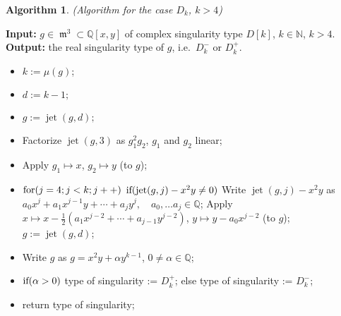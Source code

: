 \documentclass[noend]{amsproc}
\DeclareMathOperator{\m}{\mathfrak{m}}
\DeclareMathOperator{\jt}{jet}
\begin{document}
\newtheorem{D[k]k>4}[kjet]{Algorithm}
\begin{D[k]k>4}(Algorithm for the case $D_k$, $k>4$)
\end{D[k]k>4}
\noindent\textnormal{\bf Input:} $g\in \m^3\subset\mathbb Q[x,y]$ of complex
singularity type $D[k]$, $k\in\mathbb N$, $k>4$.\newline
\textnormal{\bf Output:} the real singularity type of $g$, i.e.~$D_k^-$
or $D_k^+$.
\begin{itemize}
\item $k:= \mu(g)$;
\item $d:=k-1;$
\item $g:=\jt(g,d);$
\item Factorize $\jt(g,3)$ as $g_1^2g_2$, $g_1$ and $g_2$ linear;
\item Apply $g_1\mapsto x$, $g_2\mapsto y$ (to $g$);
\item $\textnormal{for}(j=4; j<k; j++)$\newline
\phantom{}\quad $\textnormal{if}(\jt(g,j)-x^2y\neq0)$\newline
\phantom{}\quad\quad Write $\jt(g,j)-x^2y$ as
$a_0x^j+a_1x^{j-1}y+\cdots +a_jy^j,\quad a_0,\ldots a_j\in\mathbb Q$;\newline
\phantom{}\quad\quad Apply $x\mapsto x-\frac{1}{2}(a_1x^{j-2}+\cdots
+a_{j-1}y^{j-2})$, $y\mapsto y-a_0x^{j-2}$ (to $g$);\newline
\phantom{}\quad\quad $g:=\jt(g,d)$;\newline
\item Write $g$ as $g=x^2y+\alpha y^{k-1}$, $0\neq\alpha\in\mathbb Q$;
\item $\textnormal{if}(\alpha>0)$\newline
\phantom{}\quad type of singularity := $D_k^+$;\newline
else\newline
\phantom{}\quad type of singularity := $D_k^-$;
\item return type of singularity;
\end{itemize}
\end{document}
